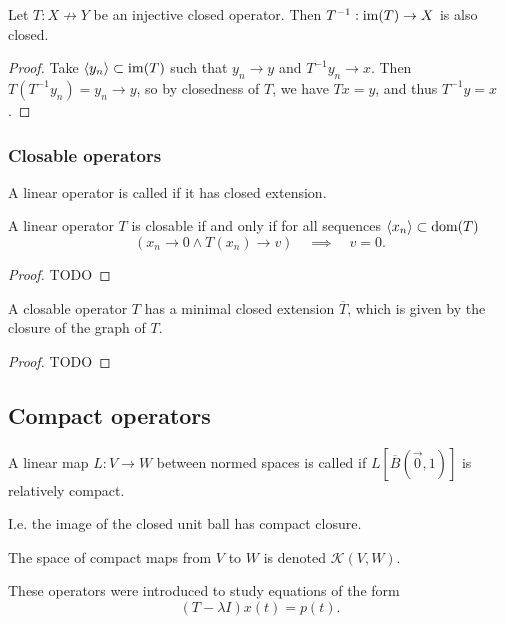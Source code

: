 \begin{lemma}
Let $T:X\not\to Y$ be an injective closed operator. Then $T^{-1}:\operatorname{im}(T)\to X$ is also closed.
\end{lemma}
\begin{proof}
Take $\langle y_n \rangle\subset \operatorname{im}(T)$ such that $y_n\to y$ and $T^{-1}y_n \to x$. Then $T(T^{-1}y_n) = y_n \to y$, so by closedness of $T$, we have $Tx = y$, and thus $T^{-1}y = x$.
\end{proof}

\subsubsection{Closable operators}
\begin{definition}
A linear operator is called  if it has closed extension.
\end{definition}

\begin{proposition}
A linear operator $T$ is closable \textup{if and only if} for all sequences $\langle x_n \rangle\subset\operatorname{dom}(T)$
\[ \left(x_n\to 0 \land T(x_n)\to v\right) \quad\implies\quad v = 0. \]
\end{proposition}
\begin{proof}
TODO
\end{proof}

\begin{lemma}
A closable operator $T$ has a minimal closed extension $\overline{T}$, which is given by the closure of the graph of $T$.
\end{lemma}
\begin{proof}
TODO
\end{proof}

\subsection{Compact operators}
\begin{definition}
A linear map $L:V\to W$ between normed spaces is called  if $L[\overline{B}(\vec{0}, 1)]$ is relatively compact.

I.e. the image of the closed unit ball has compact closure.

The space of compact maps from $V$ to $W$ is denoted $\mathcal{K}(V,W)$.
\end{definition}

These operators were introduced to study equations of the form
\[ (T-\lambda I)x(t) = p(t). \]

